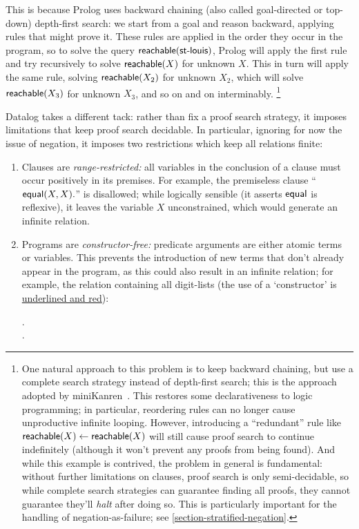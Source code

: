 This is because Prolog uses backward chaining (also called goal-directed or
top-down) depth-first search: we start from a goal and reason backward, applying
rules that might prove it.
%
These rules are applied in the order they occur in the program, so to solve the
query $\text{\sffamily reachable}({\textsf{st-louis}})$, Prolog will apply the
first rule and try recursively to solve $\text{\sffamily reachable}({X})$ for
unknown $X$.
%
This in turn will apply the same rule, solving $\text{\sffamily reachable}({X_2})$ for unknown $X_2$, which will solve $\text{\sffamily reachable}({X_3})$
for unknown $X_3$, and so on and on interminably.%
%
\footnote{One natural approach to this problem is to keep backward chaining, but
  use a complete search strategy instead of depth-first search; this is the
  approach adopted by miniKanren~\citep{kanren}. This restores some
  declarativeness to logic programming; in particular, reordering rules can no
  longer cause unproductive infinite looping. However, introducing a
  ``redundant'' rule like $\text{\sffamily reachable}({X}) \gets \text{\sffamily reachable}({X})$ will
  still cause proof search to continue indefinitely (although it won't prevent
  any proofs from being found). And while this example is contrived, the problem
  in general is fundamental: without further limitations on clauses, proof
  search is only semi-decidable, so while complete search strategies can
  guarantee finding all proofs, they cannot guarantee they'll \emph{halt} after
  doing so. This is particularly important for the handling of
  negation-as-failure; see \cref{section-stratified-negation}.}

Datalog takes a different tack: rather than fix a proof search strategy, it
imposes limitations that keep proof search decidable. In particular, ignoring
for now the issue of negation, it imposes two restrictions which keep all
 relations finite:

\begin{enumerate}
\item Clauses are \emph{range-restricted:} all variables in the conclusion of a
  clause must occur positively in its premises. For example, the premiseless
  clause ``$\text{\sffamily equal}({X,X}).$'' is disallowed; while logically sensible (it
  asserts $\text{\sffamily equal}$ is reflexive), it leaves the variable $X$
  unconstrained, which would generate an infinite relation.

\item Programs are \emph{constructor-free:} predicate arguments are either
  atomic terms or variables. This prevents the introduction of new terms that
  don't already appear in the program, as this could also result in an infinite
  relation; for example, the relation containing all digit-lists (the use of a
  `constructor' is {\color{Red}\underline{underlined and red}}):

  \nopagebreak[3]
  \begin{datalog}
    .
    \\
     \gets
     \conj {}.
  \end{datalog}
\end{enumerate}

